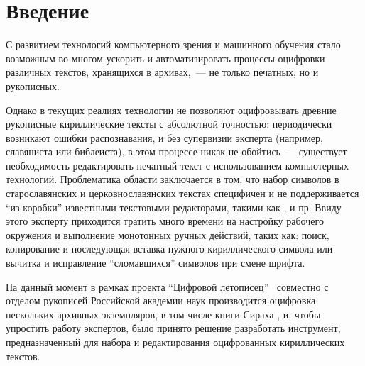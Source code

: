 
\section*{Введение}
\thispagestyle{withCompileDate}

С развитием технологий компьютерного зрения и машинного обучения стало возможным во многом ускорить и автоматизировать процессы оцифровки различных текстов, хранящихся в архивах,~--- не только печатных, но и рукописных.

Однако в текущих реалиях технологии не позволяют оцифровывать древние рукописные кириллические тексты с абсолютной точностью: периодически возникают ошибки распознавания, и без супервизии эксперта (например, славяниста или библеиста), в этом процессе никак не обойтись~--- существует необходимость редактировать печатный текст с использованием компьютерных технологий. Проблематика области заключается в том, что набор символов в старославянских и церковнославянских текстах специфичен и не поддерживается \enquote{из коробки} известными текстовыми редакторами, такими как \word{}, \librewriter{} и пр. Ввиду этого эксперту приходится тратить много времени на настройку рабочего окружения и выполнение монотонных ручных действий, таких как: поиск, копирование и последующая вставка нужного кириллического символа или вычитка и исправление \enquote{сломавшихся} символов при смене шрифта.

На данный момент в рамках проекта \enquote{Цифровой летописец}~\cite{letopisecConf} совместно с отделом рукописей Российской академии наук производится оцифровка нескольких архивных экземпляров, в том числе книги Сираха \cite{sirahPhotoYaDisk}, и, чтобы упростить работу экспертов, было принято решение разработать инструмент, предназначенный для набора и редактирования оцифрованных кириллических текстов.
